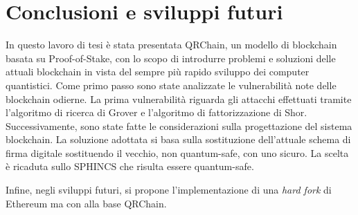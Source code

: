 \chapter{Conclusioni e sviluppi futuri}
In questo lavoro di tesi è stata presentata QRChain, un modello di blockchain basata su Proof-of-Stake, con lo scopo di introdurre problemi e soluzioni delle attuali blockchain in vista del sempre più rapido sviluppo dei computer quantistici. Come primo passo sono state analizzate le vulnerabilità note delle blockchain odierne. La prima vulnerabilità riguarda gli attacchi effettuati tramite l'algoritmo di ricerca di Grover e l'algoritmo di fattorizzazione di Shor. Successivamente, sono state fatte le considerazioni sulla progettazione del sistema blockchain. La soluzione adottata si basa sulla sostituzione dell'attuale schema di firma digitale sostituendo il vecchio, non quantum-safe, con uno sicuro. La scelta è ricaduta sullo SPHINCS che risulta essere quantum-safe.

Infine, negli sviluppi futuri, si propone l'implementazione di una \textit{hard fork} di Ethereum ma con alla base QRChain.